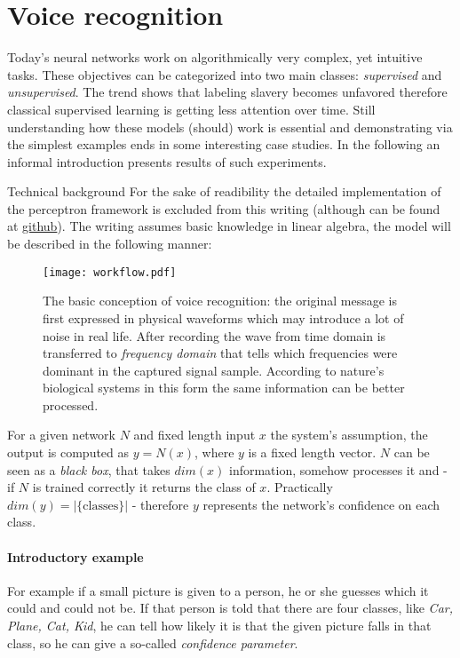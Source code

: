 \section{Voice recognition}

Today's neural networks work on algorithmically very complex, yet intuitive tasks. These objectives can be categorized into two main classes: \emph{supervised} and \emph{unsupervised}. The trend shows that labeling slavery becomes unfavored therefore classical supervised learning is getting less attention over time. Still understanding how these models (should) work is essential and demonstrating via the simplest examples ends in some interesting case studies. In the following an informal introduction presents results of such experiments.

    {Technical background}
For the sake of readibility the detailed implementation of the perceptron framework is excluded from this writing (although can be found at \href{https://github.com/botcs/deepvision/tree/master/demo/audio}{github}). 
The writing assumes basic knowledge in linear algebra, the model will be described in the following manner: \\
 
\begin{figure}
	\centering
	\texttt{[image: workflow.pdf]}
	\caption{
	The basic conception of voice recognition: 
	the original message is first expressed in physical waveforms which may introduce a lot of noise in real life. 
	After recording the wave from time domain is transferred to \emph{frequency domain} that tells which frequencies were dominant in the captured signal sample.
	According to nature's biological systems in this form the same information can be better processed.
	}
	\label{fig:workflow}
\end{figure}

For a given network $N$ and fixed length input $x$ the system's assumption, the output is computed as $y=N(x)$, where $y$ is a fixed length vector.
$N$ can be seen as a \emph{black box}, that takes $dim(x)$ information, somehow processes it and - if $N$ is trained correctly it returns the class of $x$. Practically $dim(y)=|\{\textrm{classes}\}|$ - therefore $y$ represents the network's confidence on each class.

\paragraph{Introductory example}
For example if a small picture is given to a person, he or she guesses which it could and could not be. If that person is told that there are four classes, like \emph{Car, Plane, Cat, Kid}, he can tell how likely it is that the given picture falls in that class, so he can give a so-called \emph{confidence parameter}.

